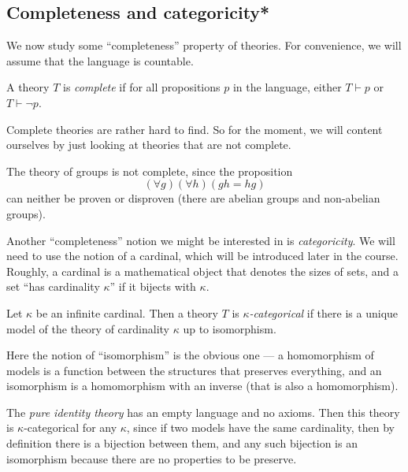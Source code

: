 \documentclass[a4paper]{article}
\begin{document}
\subsection{Completeness and categoricity*}
\begin{own}
  We now study some ``completeness'' property of theories. For convenience, we will assume that the language is countable.

  \begin{defi}
    A theory $T$ is \emph{complete} if for all propositions $p$ in the language, either $T \vdash p$ or $T \vdash \neg p$.
  \end{defi}
  Complete theories are rather hard to find. So for the moment, we will content ourselves by just looking at theories that are not complete.
  \begin{eg}
    The theory of groups is not complete, since the proposition
    \[
      (\forall g)(\forall h)(gh = hg)
    \]
    can neither be proven or disproven (there are abelian groups and non-abelian groups).
  \end{eg}
  Another ``completeness'' notion we might be interested in is \emph{categoricity}. We will need to use the notion of a cardinal, which will be introduced later in the course. Roughly, a cardinal is a mathematical object that denotes the sizes of sets, and a set ``has cardinality $\kappa$'' if it bijects with $\kappa$.
  \begin{defi}
    Let $\kappa$ be an infinite cardinal. Then a theory $T$ is \emph{$\kappa$-categorical} if there is a unique model of the theory of cardinality $\kappa$ up to isomorphism.
  \end{defi}

  Here the notion of ``isomorphism'' is the obvious one --- a homomorphism of models is a function between the structures that preserves everything, and an isomorphism is a homomorphism with an inverse (that is also a homomorphism).

  \begin{eg}
    The \emph{pure identity theory} has an empty language and no axioms. Then this theory is $\kappa$-categorical for any $\kappa$, since if two models have the same cardinality, then by definition there is a bijection between them, and any such bijection is an isomorphism because there are no properties to be preserve.
  \end{eg}


\end{own}
\end{document}
